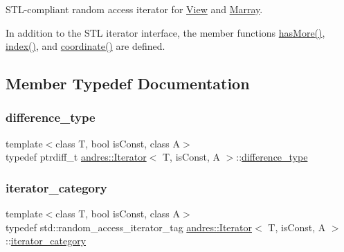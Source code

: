 S\+T\+L-\/compliant random access iterator for \hyperlink{classandres_1_1View}{View} and \hyperlink{classandres_1_1Marray}{Marray}.

In addition to the S\+TL iterator interface, the member functions \hyperlink{classandres_1_1Iterator_a26f75a0ecde5e9b0512f07234ca2f39e}{has\+More()}, \hyperlink{classandres_1_1Iterator_abf00924fc7110262606fdd9de01ebc2d}{index()}, and \hyperlink{classandres_1_1Iterator_aabb5942c0b13da2dd3450f4146635e69}{coordinate()} are defined. 

\subsection{Member Typedef Documentation}
\mbox{\label{classandres_1_1Iterator_a10f8053d87b6b597d9fe011f66a240ca}} 
\subsubsection{\texorpdfstring{difference\+\_\+type}{difference\_type}}
{\footnotesize\ttfamily template$<$class T, bool is\+Const, class A$>$ \\
typedef ptrdiff\+\_\+t \hyperlink{classandres_1_1Iterator}{andres\+::\+Iterator}$<$ T, is\+Const, A $>$\+::\hyperlink{classandres_1_1Iterator_a10f8053d87b6b597d9fe011f66a240ca}{difference\+\_\+type}}

\mbox{\label{classandres_1_1Iterator_a36e37107724fb0c9265f8d3f41f93309}} 
\subsubsection{\texorpdfstring{iterator\+\_\+category}{iterator\_category}}
{\footnotesize\ttfamily template$<$class T, bool is\+Const, class A$>$ \\
typedef std\+::random\+\_\+access\+\_\+iterator\+\_\+tag \hyperlink{classandres_1_1Iterator}{andres\+::\+Iterator}$<$ T, is\+Const, A $>$\+::\hyperlink{classandres_1_1Iterator_a36e37107724fb0c9265f8d3f41f93309}{iterator\+\_\+category}}

